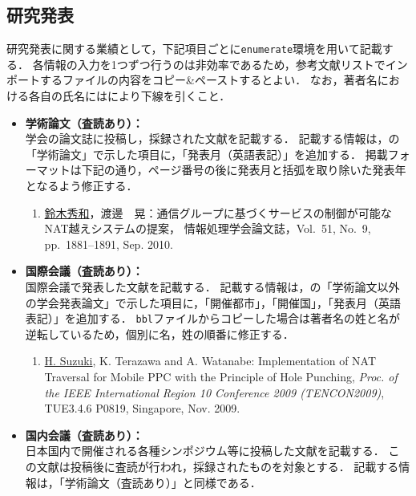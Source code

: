 \documentclass[a4j,11pt]{ujreport}
\begin{document}
\subsection{研究発表}

研究発表に関する業績として，下記項目ごとに\texttt{enumerate}環境を用いて記載する．
各情報の入力を1つずつ行うのは非効率であるため，参考文献リストでインポートするファイルの内容をコピー{\&}ペーストするとよい．
なお，著者名における各自の氏名にはにより下線を引くこと．

\begin{itemize}
\item {\bf 学術論文（査読あり）：}\\
学会の論文誌に投稿し，採録された文献を記載する．
記載する情報は，の「学術論文」で示した項目に，「発表月（英語表記）」を追加する．
掲載フォーマットは下記の通り，ページ番号の後に発表月と括弧を取り除いた発表年となるよう修正する．

\begin{screen}
\begin{enumerate}
\item \underline{鈴木秀和}，渡邊　晃：通信グループに基づくサービスの制御が可能なNAT越えシステムの提案，
情報処理学会論文誌，Vol.~51, No.~9, pp.\ 1881--1891, Sep. 2010.
\end{enumerate}
\end{screen}

\item {\bf 国際会議（査読あり）：}\\
国際会議で発表した文献を記載する．
記載する情報は，の「学術論文以外の学会発表論文」で示した項目に，「開催都市」，「開催国」，「発表月（英語表記）」を追加する．
\texttt{bbl}ファイルからコピーした場合は著者名の姓と名が逆転しているため，個別に名，姓の順番に修正する．

\begin{screen}
\begin{enumerate}
\item \underline{H. Suzuki}, K. Terazawa and A. Watanabe: Implementation of NAT Traversal for Mobile PPC with the Principle of Hole Punching,
{\em Proc. of the IEEE International Region 10 Conference 2009 (TENCON2009)},
TUE3.4.6 P0819, Singapore, Nov. 2009.
\end{enumerate}
\end{screen}

\item {\bf 国内会議（査読あり）：}\\
日本国内で開催される各種シンポジウム等に投稿した文献を記載する．
この文献は投稿後に査読が行われ，採録されたものを対象とする．
記載する情報は，「学術論文（査読あり）」と同様である．


\end{itemize}
\end{document}
